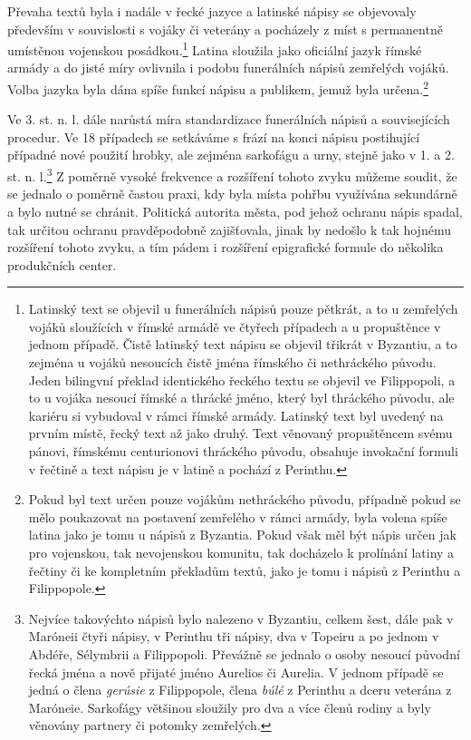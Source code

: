 Převaha textů byla i nadále v řecké jazyce a latinské nápisy se objevovaly především v souvislosti s vojáky či veterány a pocházely z míst s permanentně umístěnou vojenskou posádkou.\footnote{Latinský text se objevil u funerálních nápisů pouze pětkrát, a to u zemřelých vojáků sloužících v římské armádě ve čtyřech případech a u propuštěnce v jednom případě. Čistě latinský text nápisu se objevil třikrát v Byzantiu, a to zejména u vojáků nesoucích čistě jména římského či nethráckého původu. Jeden bilingvní překlad identického řeckého textu se objevil ve Filippopoli, a to u vojáka nesoucí římské a thrácké jméno, který byl thráckého původu, ale kariéru si vybudoval v rámci římské armády. Latinský text byl uvedený na prvním místě, řecký text až jako druhý. Text věnovaný propuštěncem svému pánovi, římskému centurionovi thráckého původu, obsahuje invokační formuli v řečtině a text nápisu je v latině a pochází z Perinthu.} Latina sloužila jako oficiální jazyk římské armády a do jisté míry ovlivnila i podobu funerálních nápisů zemřelých vojáků. Volba jazyka byla dána spíše funkcí nápisu a publikem, jemuž byla určena.\footnote{Pokud byl text určen pouze vojákům nethráckého původu, případně pokud se mělo poukazovat na postavení zemřelého v rámci armády, byla volena spíše latina jako je tomu u nápisů z Byzantia. Pokud však měl být nápis určen jak pro vojenskou, tak nevojenskou komunitu, tak docházelo k prolínání latiny a řečtiny či ke kompletním překladům textů, jako je tomu i nápisů z Perinthu a Filippopole.}

Ve 3. st. n. l. dále narůstá míra standardizace funerálních nápisů a souvisejících procedur. Ve 18 případech se setkáváme s frází na konci nápisu postihující případné nové použití hrobky, ale zejména sarkofágu a urny, stejně jako v 1. a 2. st. n. l.\footnote{Nejvíce takovýchto nápisů bylo nalezeno v Byzantiu, celkem šest, dále pak v Maróneii čtyři nápisy, v Perinthu tři nápisy, dva v Topeiru a po jednom v Abdéře, Sélymbrii a Filippopoli. Převážně se jednalo o osoby nesoucí původní řecká jména a nově přijaté jméno Aurelios či Aurelia. V jednom případě se jedná o člena {\em gerúsie} z Filippopole, člena {\em búlé} z Perinthu a dceru veterána z Maróneie. Sarkofágy většinou sloužily pro dva a více členů rodiny a byly věnovány partnery či potomky zemřelých.} Z poměrně vysoké frekvence a rozšíření tohoto zvyku můžeme soudit, že se jednalo o poměrně častou praxi, kdy byla místa pohřbu využívána sekundárně a bylo nutné se chránit. Politická autorita města, pod jehož ochranu nápis spadal, tak určitou ochranu pravděpodobně zajišťovala, jinak by nedošlo k tak hojnému rozšíření tohoto zvyku, a tím pádem i rozšíření epigrafické formule do několika produkčních center.

